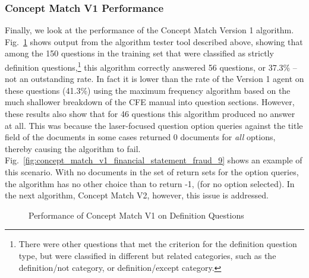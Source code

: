 \subsubsection{Concept Match V1 Performance}

Finally, we look at the performance of the Concept Match Version 1 algorithm.  Fig.~\ref{fig:concept_match_v1_training_set_results_def} shows output from the algorithm tester tool described above, showing that among the 150 questions in the training set that were classified as strictly definition questions,\footnote{There were other questions that met the criterion for the definition question type, but were classified in different but related categories, such as the definition/not category, or definition/except category.} this algorithm correctly answered 56 questions, or 37.3\% -- not an outstanding rate.  In fact it is lower than the rate of the Version 1 agent on these questions (41.3\%) using the maximum frequency algorithm based on the much shallower breakdown of the CFE manual into question sections.  However, these results also show that for 46 questions this algorithm produced no answer at all.  This was because the laser-focused question option queries against the title field of the documents in some cases returned 0 documents for \emph{all} options, thereby causing the algorithm to fail.  Fig.~\ref{fig:concept_match_v1_financial_statement_fraud_9} shows an example of this scenario.  With no documents in the set of return sets for the option queries, the algorithm has no other choice than to return -1, (for no option selected).  In the next algorithm, Concept Match V2, however, this issue is addressed.


\begin{figure}
\centering
\vspace{1.0in}
\caption{Performance of Concept Match V1 on Definition Questions}
\label{fig:concept_match_v1_training_set_results_def}
\end{figure}

